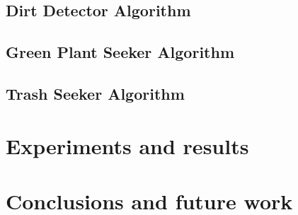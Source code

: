 \documentclass[runningheads,a4paper]{llncs}
\begin{document}
\subsection{Dirt Detector Algorithm}
\lipsum[15-17]
\subsection{Green Plant Seeker Algorithm}
\lipsum[18-20]
\subsection{Trash Seeker Algorithm}
\lipsum[20-22]

\section{Experiments and results}
\lipsum[23-24]

\section{Conclusions and future work}
\lipsum[25-26]


%
%

%
%
%

\nocite{*}

%
%

\newpage


\end{document}
